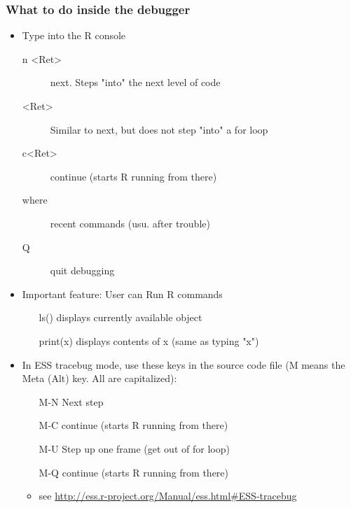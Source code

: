 \documentclass[10pt,english]{beamer}
\begin{document}
\begin{frame}
  \frametitle{What to do inside the debugger}
  \begin{itemize}

  \item Type into the R console
    \begin{description}
    \item [{n <Ret>}] next. Steps "into" the next level of code
    \item [{<Ret>}] Similar to next, but does not step "into" a for loop
    \item [{c<Ret>}] continue (starts R running from there)
    \item [{where}] recent commands (usu. after trouble)
    \item[{Q}] quit debugging
      
   \end{description}
   
  \item Important feature: User can Run R commands
    \begin{itemize}
    \item [ls()] displays currently available object
    \item [print(x)] displays contents of x (same as typing "x")
    \end{itemize}
    
  \item In ESS tracebug mode, use these keys in the source code file
    (M means the Meta (Alt) key. All are capitalized): 
    \begin{itemize}
    \item [{M-N}] Next step
    \item [{M-C}] continue (starts R running from there)
    \item [{M-U}] Step up one frame (get out of for loop)
    \item [{M-Q}] continue (starts R running from there)
    \item see \url{http://ess.r-project.org/Manual/ess.html#ESS-tracebug}
    \end{itemize}
 \end{itemize}
\end{frame}
\end{document}

